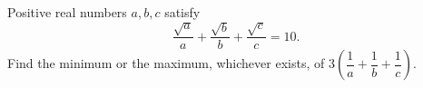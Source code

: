 Positive real numbers $a,b,c$ satisfy
\[\dfrac{\sqrt a}{a}+\dfrac{\sqrt b}{b}+\dfrac{\sqrt c}{c}=10.\]
Find the minimum or the maximum, whichever exists, of $3\left(\dfrac1a+\dfrac1b+\dfrac1c\right)$.

